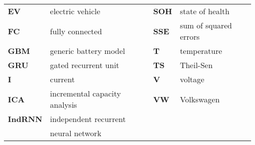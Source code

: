 \begin{table*}
\begin{tabular}{llcll}
\textbf{EV} & electric vehicle && \textbf{SOH} & state of health\\
\textbf{FC} & fully connected && \textbf{SSE} & sum of squared errors\\
\textbf{GBM} & generic battery model && \textbf{T} & temperature\\
\textbf{GRU} & gated recurrent unit && \textbf{TS} & Theil-Sen\\
\textbf{I} & current && \textbf{V} & voltage\\
\textbf{ICA} & incremental capacity analysis && \textbf{VW} & Volkswagen \\
\textbf{IndRNN} & independent recurrent &&& \\
& neural network &&&\\
\end{tabular}
\end{table*}

